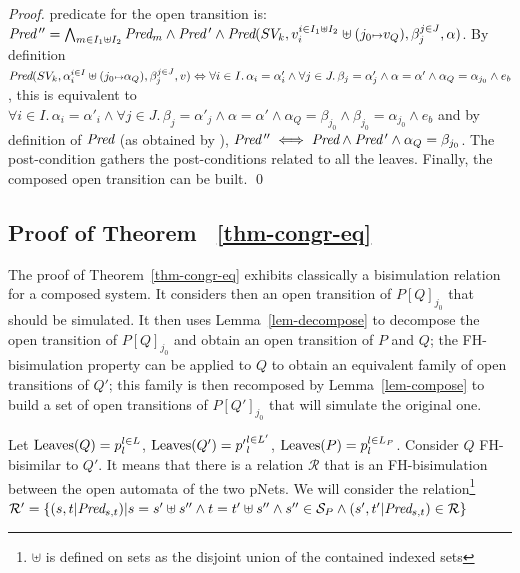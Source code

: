 \documentclass{lncs/llncs}
\begin{document}
\begin{small}
\begin{proof}
predicate for the open 
transition is: $\Pred\,''=\bigwedge_{m\in I _1\uplus I_2}\Pred_m \land \Pred\,'
\land \Pred(SV_k,v_i^{i\in I_1\uplus I_2}\uplus(j_0\mapsto v_Q),\beta_j^{j\in 
J},\alpha)$. 
By definition 
$\Pred(SV_k,\alpha_i^{i\in I}\uplus(j_0\mapsto \alpha_Q),\beta_j^{j\in 
J},v)\Leftrightarrow
	\forall i\in I.\, \alpha_i=\alpha'_i\land \forall j \in J.\, \beta_j=\alpha'_j \land 
	\alpha=\alpha'\land \alpha_Q=\alpha_{j_0}\land e_b$,
this is equivalent to $\forall i\in I.\, \alpha_i=\alpha'_i\land \forall j \in J.\, 
\beta_j=\alpha'_j \land 
	\alpha=\alpha'\land \alpha_Q=\beta_{j_0}\land \beta_{j_0}=\alpha_{j_0}\land e_b$
 and by definition of $\Pred$ (as obtained by \TrDeux),
	$\Pred\,''\iff \Pred\land\Pred\,'\land \alpha_Q=\beta_{j_0}$. The post-condition 
	gathers the post-conditions related to all 
	the leaves. Finally, the composed open transition can be
        built. \qed
        \end{proof}
\end{small}


 \subsection{Proof of Theorem ~\ref{thm-congr-eq}}
 The proof of Theorem~\ref{thm-congr-eq} exhibits classically a bisimulation relation for 
 a 
 composed system.  It considers then an open transition of $P[Q]_{j_0}$ that should be 
 simulated. It then uses  Lemma~\ref{lem-decompose} to decompose the open transition 
 of $P[Q]_{j_0}$ and obtain an open transition of $P$ and $Q$; the FH-bisimulation 
 property can 
 be applied  to $Q$ to obtain an equivalent family of open transitions of $Q'$; this 
 family is 
 then recomposed by Lemma~\ref{lem-compose} to build a set of open transitions of 
 $P[Q']_{j_0}$ 
 that will simulate the original one.
 

 Let $\operatorname{Leaves}(Q)=p_l^{l\in L}$, $\operatorname{Leaves}(Q')={p'}_l^{l\in L'}$, 
 $\operatorname{Leaves}(P)=p_l^{l\in L_P}$.
 Consider $Q$ FH-bisimilar to $Q'$. It means that there is a relation 
 $\mathcal{R}$ that is an FH-bisimulation between the open automata of the two pNets. 
 We will consider the relation\footnote{$\uplus$ is defined on sets as the disjoint union 
 of the contained indexed 
 sets} $\mathcal{R}'=\{(s,t|\Pred_{s,t})|s=s'\uplus s'' \land 
 t=t'\uplus s'' \land s''\in \mathcal{S}_P \land (s',t'|\Pred_{s,t})\in\mathcal{R}\}$ 
  
\end{document}
